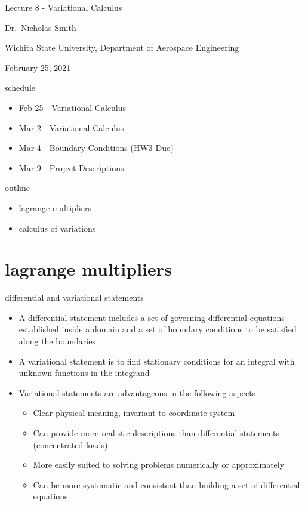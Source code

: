\documentclass[
  letterpaper,
  ignorenonframetext,
  aspectratio=43,
  handout,
  12pt]{beamer}
\author{}
\date{}
\providecommand{\tightlist}{%
  \setlength{\itemsep}{0pt}\setlength{\parskip}{0pt}}
\providecommand{\tightlist}{%
\setlength{\itemsep}{0pt}\setlength{\parskip}{0pt}}
\begin{document}
\begin{frame}
Lecture 8 - Variational Calculus

Dr.~Nicholas Smith

Wichita State University, Department of Aerospace Engineering

February 25, 2021
\end{frame}

\begin{frame}{schedule}
\protect\hypertarget{schedule}{}
\begin{itemize}
\tightlist
\item
  Feb 25 - Variational Calculus
\item
  Mar 2 - Variational Calculus
\item
  Mar 4 - Boundary Conditions (HW3 Due)
\item
  Mar 9 - Project Descriptions
\end{itemize}
\end{frame}

\begin{frame}{outline}
\protect\hypertarget{outline}{}
\begin{itemize}
\tightlist
\item
  lagrange multipliers
\item
  calculus of variations
\end{itemize}
\end{frame}

\hypertarget{lagrange-multipliers}{%
\section{lagrange multipliers}\label{lagrange-multipliers}}

\begin{frame}{differential and variational statements}
\protect\hypertarget{differential-and-variational-statements}{}
\begin{itemize}
\tightlist
\item
  A differential statement includes a set of governing differential
  equations established inside a domain and a set of boundary conditions
  to be satisfied along the boundaries
\item
  A variational statement is to find stationary conditions for an
  integral with unknown functions in the integrand
\item
  Variational statements are advantageous in the following aspects

  \begin{itemize}
  \tightlist
  \item
    Clear physical meaning, invariant to coordinate system
  \item
    Can provide more realistic descriptions than differential statements
    (concentrated loads)
  \item
    More easily suited to solving problems numerically or approximately
  \item
    Can be more systematic and consistent than building a set of
    differential equations
  \end{itemize}
\end{itemize}
\end{frame}
\end{document}
